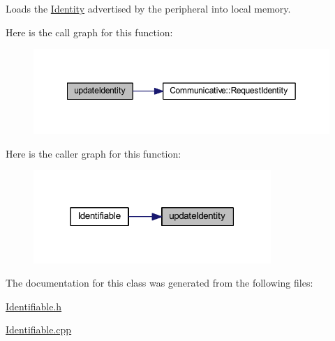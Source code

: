 Loads the \mbox{\hyperlink{struct_identity}{Identity}} advertised by the peripheral into local memory. 

Here is the call graph for this function\+:
\nopagebreak
\begin{figure}[H]
\begin{center}
\leavevmode
\includegraphics[width=349pt]{class_identifiable_ae99f8914426041ea02932d0ed00b29c3_cgraph}
\end{center}
\end{figure}
Here is the caller graph for this function\+:
\nopagebreak
\begin{figure}[H]
\begin{center}
\leavevmode
\includegraphics[width=255pt]{class_identifiable_ae99f8914426041ea02932d0ed00b29c3_icgraph}
\end{center}
\end{figure}


The documentation for this class was generated from the following files\+:\begin{DoxyCompactItemize}
\item 
\mbox{\hyperlink{_identifiable_8h}{Identifiable.\+h}}\item 
\mbox{\hyperlink{_identifiable_8cpp}{Identifiable.\+cpp}}\end{DoxyCompactItemize}
